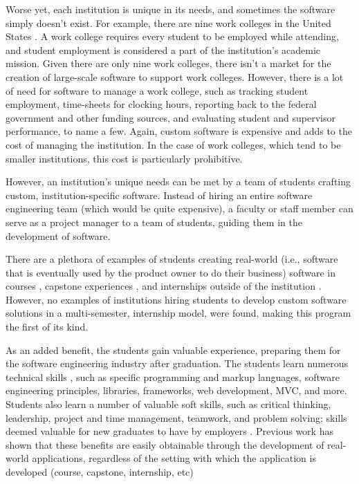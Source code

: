 Worse yet, each institution is unique in its needs, and sometimes the software simply doesn't exist. For example, there are nine work colleges in the United States \cite{WCCMembers, Ecclesia}. A work college requires every student to be employed while attending, and student employment is considered a part of the institution's academic mission. Given there are only nine work colleges, there isn't a market for the creation of large-scale software to support work colleges. However, there is a lot of need for software to manage a work college, such as tracking student employment, time-sheets for clocking hours, reporting back to the federal government and other funding sources, and evaluating student and supervisor performance, to name a few. Again, custom software is expensive and adds to the cost of managing the institution. In the case of work colleges, which tend to be smaller institutions, this cost is particularly prohibitive. 

However, an institution's unique needs can be met by a team of students crafting custom, institution-specific software. Instead of hiring an entire software engineering team (which would be quite expensive), a faculty or staff member can serve as a project manager to a team of students, guiding them in the development of software. 

There are a plethora of examples of students creating real-world (i.e., software that is eventually used by the product owner to do their business) software in courses \cite{coursevsproject, tadayon2004software}, capstone experiences \cite{keogh2007scalable, capstone}, and internships outside of the institution \cite{rochesterfirstundergradsoftwareteam}. However, no examples of institutions hiring students to develop custom software solutions in a multi-semester, internship model, were found, making this program the first of its kind.


As an added benefit, the students gain valuable experience, preparing them for the software engineering industry after graduation. The students learn numerous technical skills \cite{hardskills}, such as specific programming and markup languages, software engineering principles, libraries, frameworks, web development, MVC, and more. Students also learn a number of valuable soft skills, such as critical thinking, leadership, project and time management, teamwork, and problem solving; skills deemed valuable for new graduates to have by employers \cite{lavy2013soft}. Previous work has shown that these benefits are easily obtainable through the development of real-world applications, regardless of the setting with which the application is developed (course, capstone, internship, etc) \cite{heggen2018hiring, liu2005enriching}

